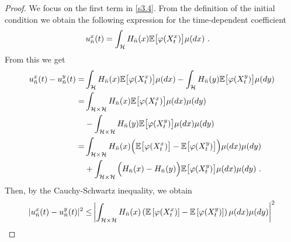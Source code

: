 \documentclass[review, onefignum, onetabnum]{siamart171218}
\begin{document}
\begin{proof}
    We focus on the first term in \eqref{s3.4}. From the definition of the
initial condition we obtain the following expression for
the time-dependent coefficient
\begin{align*}
  u_{\bar n}^x(t) &=
    \int_{\mathcal{H}} H_{\bar n}(x) \mathbb{E}\big[\varphi(X_t^x)\big] \mu(dx) \ .
\end{align*}
%
From this we get
\begin{align*}
    u_{\bar n}^x(t)-u_{\bar n}^y(t)
        =&
        \int_{\mathcal{H}} H_{\bar n}(x)
            \mathbb{E}\big[
                \varphi(X_t^x)
            \big]
            \mu(dx) -
            \int_{\mathcal{H}} H_{\bar n}(y)
            \mathbb{E}\big[
                \varphi(X_t^y)
            \big] \mu(dy)
        \\
        =&
        \int_{\mathcal{H} \times \mathcal{H}} H_{\bar n}(x)
            \mathbb{E}\big[
                \varphi(X_t^x)
            \big] \mu(dx)\mu(dy)
        \\
        &-
             \int_{\mathcal{H}\times \mathcal{H}} H_{\bar n}(y)
                \mathbb{E}\big[
                    \varphi(X_t^y)
                \big]
            \mu(dx)\mu(dy)
        \\
        =&
        \int_{\mathcal{H}\times \mathcal{H}} H_{\bar n}(x)
            \Big(
                \mathbb{E}\big[
                    \varphi(X_t^x)
                \big]
                -
                \mathbb{E}\big[
                    \varphi(X_t^y)
                \big]
            \Big)
            \mu(dx)\mu(dy)
        \\
        &+
        \int_{\mathcal{H}\times \mathcal{H}}
            \Big(
                H_{\bar n}(x) - H_{\bar n}(y)
            \Big)
            \mathbb{E}\big[
                \varphi(X_t^y)
            \big] \mu(dx) \mu(dy) \ .
\end{align*}
%
%
%
Then, by the Cauchy-Schwartz inequality, we obtain
%
%
%
\begin{equation}
    \begin{aligned}
        |u_{\bar n} ^ x(t) - u_{\bar n} ^ y(t)| ^ 2
            \le&
            \left|
                \int_{\mathcal{H} 
                \times
                \mathcal{H}} H_{\bar n}(x)
                \left(
                    \E
                     \left[
                        \varphi(X_t^x)
                     \right]
                     -
                    \E\left[
                        \varphi(X_t^y)
                    \right]
                \right) \mu(dx)\mu(dy)
            \right|^2
            \\

\end{aligned}
\end{equation}
\end{proof}
\end{document}
